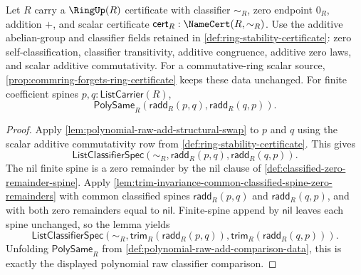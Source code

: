 \begin{theorem}
\label{thm:polynomial-raw-add-commutativity-from-scalar-additive-commutativity}
Let $R$ carry a $\RingUp(R)$ certificate with classifier $\sim_R$, zero endpoint $0_R$, addition $+$, and scalar certificate $\mathsf{cert}_R:\NameCert(R,\sim_R)$. Use the additive abelian-group and classifier fields retained in \autoref{def:ring-stability-certificate}: zero self-classification, classifier transitivity, additive congruence, additive zero laws, and scalar additive commutativity. For a commutative-ring scalar source, \autoref{prop:commring-forgets-ring-certificate} keeps these data unchanged. For finite coefficient spines $p,q:\mathsf{ListCarrier}(R)$,
$$
\mathsf{PolySame}_R(\mathsf{radd}_R(p,q),\mathsf{radd}_R(q,p)).
$$
\end{theorem}
\begin{proof}
Apply \autoref{lem:polynomial-raw-add-structural-swap} to $p$ and $q$ using the scalar additive commutativity row from \autoref{def:ring-stability-certificate}. This gives
$$
\mathsf{ListClassifierSpec}(\sim_R,\mathsf{radd}_R(p,q),\mathsf{radd}_R(q,p)).
$$
The nil finite spine is a zero remainder by the nil clause of \autoref{def:classified-zero-remainder-spine}. Apply \autoref{lem:trim-invariance-common-classified-spine-zero-remainders} with common classified spines $\mathsf{radd}_R(p,q)$ and $\mathsf{radd}_R(q,p)$, and with both zero remainders equal to $\mathsf{nil}$. Finite-spine append by $\mathsf{nil}$ leaves each spine unchanged, so the lemma yields
$$
\mathsf{ListClassifierSpec}(\sim_R,\mathsf{trim}_R(\mathsf{radd}_R(p,q)),\mathsf{trim}_R(\mathsf{radd}_R(q,p))).
$$
Unfolding $\mathsf{PolySame}_R$ from \autoref{def:polynomial-raw-add-comparison-data}, this is exactly the displayed polynomial raw classifier comparison.
\end{proof}

